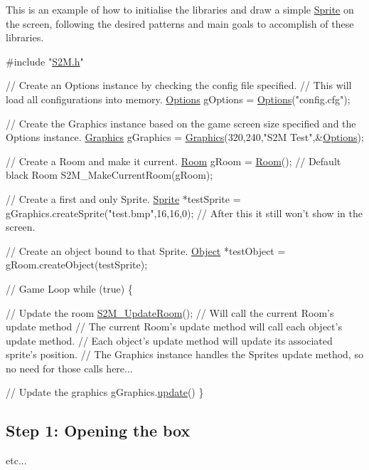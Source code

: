 This is an example of how to initialise the libraries and draw a simple \hyperlink{class_sprite}{Sprite} on the screen, following the desired patterns and main goals to accomplish of these libraries. 
\begin{DoxyCode}
\textcolor{preprocessor}{#include "\hyperlink{_s2_m_8h}{S2M.h}"}

\textcolor{comment}{// Create an Options instance by checking the config file specified.}
\textcolor{comment}{// This will load all configurations into memory.}
\hyperlink{class_options}{Options} gOptions = \hyperlink{class_options}{Options}(\textcolor{stringliteral}{"config.cfg"});

\textcolor{comment}{// Create the Graphics instance based on the game screen size specified and the Options instance.}
\hyperlink{class_graphics}{Graphics} gGraphics = \hyperlink{class_graphics}{Graphics}(320,240,\textcolor{stringliteral}{"S2M Test"},&\hyperlink{class_options}{Options});

\textcolor{comment}{// Create a Room and make it current.}
\hyperlink{class_room}{Room} gRoom = \hyperlink{class_room}{Room}(); \textcolor{comment}{// Default black Room}
S2M\_MakeCurrentRoom(gRoom);

\textcolor{comment}{// Create a first and only Sprite.}
\hyperlink{class_sprite}{Sprite} *testSprite = gGraphics.createSprite(\textcolor{stringliteral}{"test.bmp"},16,16,0); \textcolor{comment}{// After this it still won't show in
       the screen.}

\textcolor{comment}{// Create an object bound to that Sprite.}
\hyperlink{class_object}{Object} *testObject = gRoom.createObject(testSprite);

\textcolor{comment}{// Game Loop}
\textcolor{keywordflow}{while} (\textcolor{keyword}{true}) \{

    \textcolor{comment}{// Update the room}
    \hyperlink{_s2_m_8h_a7e17b634091c660ba4b52f5a0940d7e4}{S2M\_UpdateRoom}();   \textcolor{comment}{// Will call the current Room's update method}
                        \textcolor{comment}{// The current Room's update method will call each object's update method.}
                        \textcolor{comment}{// Each object's update method will update its associated sprite's position.}
                        \textcolor{comment}{// The Graphics instance handles the Sprites update method, so no need for those
       calls here...}

    \textcolor{comment}{// Update the graphics}
    gGraphics.\hyperlink{class_graphics_a5a5297a160c22f73300dcf72ac0be7c2}{update}()
\}
\end{DoxyCode}
\hypertarget{index_step1}{}\subsection{Step 1\-: Opening the box}\label{index_step1}
etc... 